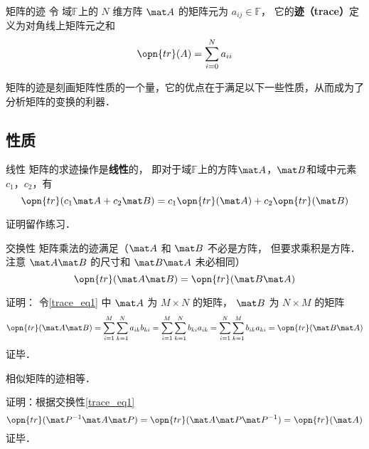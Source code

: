 


\begin{definition}{矩阵的迹}
令 域$\mathbb{F}$上的 $N$ 维方阵 $\mat A$ 的矩阵元为 $a_{ij}\in\mathbb{F}$， 它的\textbf{迹（trace）}定义为对角线上矩阵元之和
\begin{equation}
\opn{tr}(A) = \sum_{i=0}^N a_{ii}
\end{equation}
\end{definition}

矩阵的迹是刻画矩阵性质的一个量，它的优点在于满足以下一些性质，从而成为了分析矩阵的变换的利器．


\subsection{性质}
\begin{theorem}{线性}
矩阵的求迹操作是\textbf{线性}的， 即对于域$\mathbb{F}$上的方阵$\mat A$，$\mat B$和域中元素$c_1$，$c_2$，有
\begin{equation}
\opn{tr}(c_1\mat A+c_2\mat B) = c_1\opn{tr}(\mat A) + c_2\opn{tr}(\mat B)
\end{equation}
\end{theorem}
证明留作练习．

\begin{theorem}{交换性}
矩阵乘法的迹满足（$\mat A$ 和 $\mat B$ 不必是方阵， 但要求乘积是方阵． 注意 $\mat A\mat B$ 的尺寸和 $\mat B\mat A$ 未必相同）
\begin{equation}\label{trace_eq1}
\opn{tr}(\mat A\mat B) = \opn{tr}(\mat B\mat A)
\end{equation}
\end{theorem}
证明： 令\autoref{trace_eq1} 中 $\mat A$ 为 $M\times N$ 的矩阵， $\mat B$ 为 $N\times M$ 的矩阵
\begin{equation}
\opn{tr}(\mat A\mat B) = \sum_{i=1}^M \sum_{k=1}^N a_{ik}b_{ki} = \sum_{i=1}^M \sum_{k=1}^N b_{ki}a_{ik} = \sum_{i=1}^N \sum_{k=1}^M b_{ik}a_{ki} = \opn{tr}(\mat B\mat A)
\end{equation}
证毕．

\begin{theorem}{}
相似矩阵的迹相等．
\end{theorem}
证明：根据交换性\autoref{trace_eq1} 
$$\opn{tr}(\mat P^{-1}\mat A\mat P) = \opn{tr}(\mat A\mat P\mat P^{-1}) = \opn{tr}(\mat A)$$
证毕．


